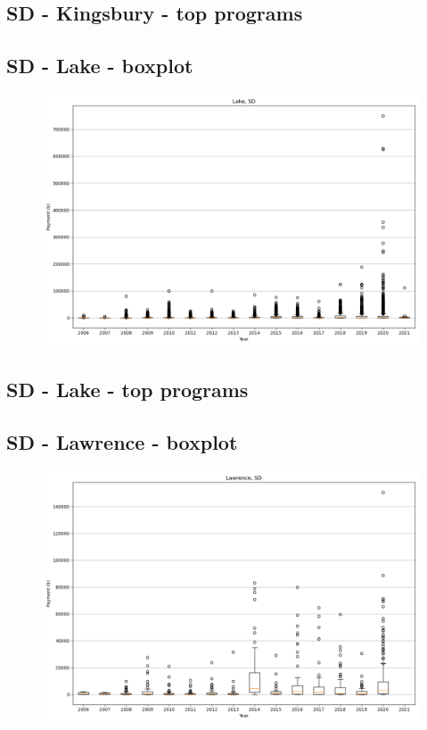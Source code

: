 \subsection*{SD - Kingsbury - top programs}

\newpage
\subsection*{SD - Lake - boxplot}
\begin{figure}[h]
\centering
\includegraphics[width=7in]{../output/boxplots/counties/Lake-SD_boxplot.png}
\end{figure}


\subsection*{SD - Lake - top programs}

\newpage
\subsection*{SD - Lawrence - boxplot}
\begin{figure}[h]
\centering
\includegraphics[width=7in]{../output/boxplots/counties/Lawrence-SD_boxplot.png}
\end{figure}


